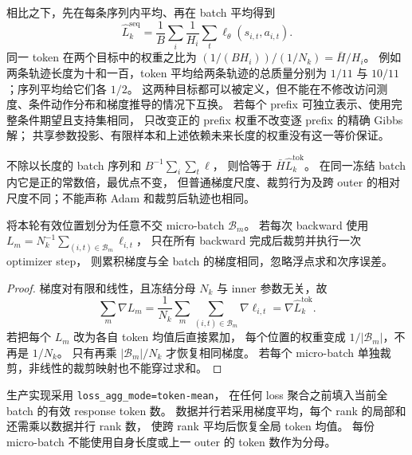 相比之下，先在每条序列内平均、再在 batch 平均得到
\begin{equation}
 \widehat L_k^{\mathrm{seq}}=
 \frac1B\sum_i\frac1{H_i}\sum_t\ell_\theta(s_{i,t},a_{i,t}).
\end{equation}
同一 token 在两个目标中的权重之比为
$(1/(BH_i))/(1/N_k)=\bar H/H_i$。
例如两条轨迹长度为十和一百，token 平均给两条轨迹的总质量分别为
$1/11$ 与 $10/11$；序列平均给它们各 $1/2$。
这两种目标都可以被定义，但不能在不修改访问测度、条件动作分布和梯度推导的情况下互换。
若每个 prefix 可独立表示、使用完整条件期望且支持集相同，
只改变正的 prefix 权重不改变逐 prefix 的精确 Gibbs 解；
共享参数投影、有限样本和上述依赖未来长度的权重没有这一等价保证。

不除以长度的 batch 序列和 $B^{-1}\sum_i\sum_t\ell$，
则恰等于 $\bar H\widehat L_k^{\mathrm{tok}}$。
在同一冻结 batch 内它是正的常数倍，最优点不变，
但普通梯度尺度、裁剪行为及跨 outer 的相对尺度不同；不能声称 Adam 和裁剪后轨迹也相同。

\begin{proposition}
将本轮有效位置划分为任意不交 micro-batch $\mathcal B_m$。
若每次 backward 使用
$L_m=N_k^{-1}\sum_{(i,t)\in\mathcal B_m}\ell_{i,t}$，
只在所有 backward 完成后裁剪并执行一次 optimizer step，
则累积梯度与全 batch 的梯度相同，忽略浮点求和次序误差。
\end{proposition}
\begin{proof}
梯度对有限和线性，且冻结分母 $N_k$ 与 inner 参数无关，故
\begin{equation}
 \sum_m\nabla L_m
 =\frac1{N_k}\sum_m\sum_{(i,t)\in\mathcal B_m}\nabla\ell_{i,t}
 =\nabla\widehat L_k^{\mathrm{tok}}.
\end{equation}
若把每个 $L_m$ 改为各自 token 均值后直接累加，
每个位置的权重变成 $1/|\mathcal B_m|$，不再是 $1/N_k$。
只有再乘 $|\mathcal B_m|/N_k$ 才恢复相同梯度。
若每个 micro-batch 单独裁剪，非线性的裁剪映射也不能穿过求和。
\end{proof}

生产实现采用 \texttt{loss\_agg\_mode=token-mean}，
在任何 loss 聚合之前填入当前全 batch 的有效 response token 数。
数据并行若采用梯度平均，每个 rank 的局部和还需乘以数据并行 rank 数，
使跨 rank 平均后恢复全局 token 均值。
每份 micro-batch 不能使用自身长度或上一 outer 的 token 数作为分母。
